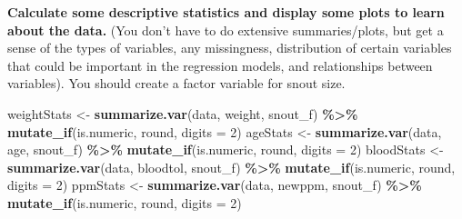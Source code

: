 \documentclass[
]{article}
\newenvironment{Shaded}{\begin{snugshade}}{\end{snugshade}}
\newcommand{\AttributeTok}[1]{\textcolor[rgb]{0.13,0.29,0.53}{#1}}
\newcommand{\DecValTok}[1]{\textcolor[rgb]{0.00,0.00,0.81}{#1}}
\newcommand{\FunctionTok}[1]{\textcolor[rgb]{0.13,0.29,0.53}{\textbf{#1}}}
\newcommand{\NormalTok}[1]{#1}
\newcommand{\OtherTok}[1]{\textcolor[rgb]{0.56,0.35,0.01}{#1}}
\newcommand{\SpecialCharTok}[1]{\textcolor[rgb]{0.81,0.36,0.00}{\textbf{#1}}}
\begin{document}
\textbf{Calculate some descriptive statistics and display some plots to
learn about the data.} (You don't have to do extensive summaries/plots,
but get a sense of the types of variables, any missingness, distribution
of certain variables that could be important in the regression models,
and relationships between variables). You should create a factor
variable for snout size.

\begin{Shaded}
\begin{Highlighting}[]
\NormalTok{weightStats }\OtherTok{\textless{}{-}} \FunctionTok{summarize.var}\NormalTok{(data, weight, snout\_f) }\SpecialCharTok{\%\textgreater{}\%}
  \FunctionTok{mutate\_if}\NormalTok{(is.numeric, round, }\AttributeTok{digits =} \DecValTok{2}\NormalTok{)}
\NormalTok{ageStats }\OtherTok{\textless{}{-}} \FunctionTok{summarize.var}\NormalTok{(data, age, snout\_f) }\SpecialCharTok{\%\textgreater{}\%}
  \FunctionTok{mutate\_if}\NormalTok{(is.numeric, round, }\AttributeTok{digits =} \DecValTok{2}\NormalTok{)}
\NormalTok{bloodStats }\OtherTok{\textless{}{-}} \FunctionTok{summarize.var}\NormalTok{(data, bloodtol, snout\_f) }\SpecialCharTok{\%\textgreater{}\%}
  \FunctionTok{mutate\_if}\NormalTok{(is.numeric, round, }\AttributeTok{digits =} \DecValTok{2}\NormalTok{)}
\NormalTok{ppmStats }\OtherTok{\textless{}{-}} \FunctionTok{summarize.var}\NormalTok{(data, newppm, snout\_f) }\SpecialCharTok{\%\textgreater{}\%}
  \FunctionTok{mutate\_if}\NormalTok{(is.numeric, round, }\AttributeTok{digits =} \DecValTok{2}\NormalTok{)}


\end{Highlighting}
\end{Shaded}
\end{document}
